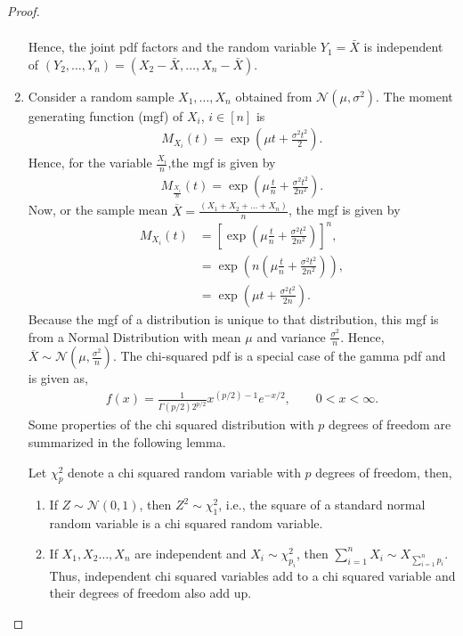 \documentclass[a4paper,english,12pt]{article}
\begin{document}
\begin{proof}
\begin{enumerate}
\begin{align}
\end{align}
Hence, the joint pdf factors and the random variable $Y_1=\bar{X}$ is independent of $ \left(Y_{2},\ldots,Y_{n}\right)=\left(X_{2}-\bar{X},\ldots,X_{n}-\bar{X}\right) $. 
\item Consider a random sample $X_1,\dots ,X_n$ obtained from $\mathcal{N}(\mu,\sigma^2)$. The moment generating function (mgf) of $X_i$, $i\in[n]$ is 
\begin{align}
M_{X_i}(t)=\exp{(\mu t +\frac{\sigma^2 t^2}{2})}.
\end{align}
Hence, for the variable $\frac{X_i}{n}$,the mgf is given by 
\begin{align}
M_{\frac{X_i}{n}}(t)=\exp{(\mu \frac{t}{n} +\frac{\sigma^2 t^2}{2n^2})}.
\end{align}
Now, or the sample mean $\overline{X}=\frac{(X_1+X_2+\dots +X_n)}{n}$, the mgf is given by 
\begin{align}
M_{X_i}(t)&={\left[\exp{(\mu \frac{t}{n} +\frac{\sigma^2 t^2}{2n^2})}\right]}^n, \nonumber \\
&=\exp{(n(\mu \frac{t}{n} +\frac{\sigma^2 t^2}{2n^2}))}, \nonumber \\
&=\exp{(\mu t +\frac{\sigma^2 t^2}{2n})}.
\end{align}
Because the mgf of a distribution is unique to that distribution, this mgf is from a Normal Distribution with mean $\mu$ and variance $\frac{\sigma^2}{n}$. Hence, $\overline{X} \sim \mathcal{N}(\mu,\frac{\sigma^2}{n}).$
The chi-squared pdf is a special case of the gamma pdf and is given as, 
\begin{align}
f(x)=\frac{1}{\Gamma(p/2)2^{p/2}}x^{(p/2)-1}e^{-x/2}, \qquad 0<x<\infty. 
\end{align}
Some properties of the chi squared distribution with $p$ degrees of freedom are summarized in the following lemma. 
\begin{lem} \label{lemma_5.3.2_casella_berger}
Let $\chi _p^2$ denote a chi squared random variable with $p$ degrees of freedom, then, 
\renewcommand{\labelenumi}{\alph{enumi})}
\begin{enumerate}
\item If $Z\sim \mathcal{N}(0,1)$, then $Z^2 \sim \chi_1^2$, i.e., the  square of a standard normal random variable is a chi squared random variable. 
\item If $X_1,X_2\dots , X_n$ are independent and $X_i\sim \chi _{p_i}^2$, then $\sum_{i=1}^nX_i\sim X_{\sum_{i=1}^np_i}$. Thus, independent chi squared variables add to a chi squared variable and their degrees of freedom also add up. 

\end{enumerate}
\end{lem}
\end{enumerate}
\end{proof}
\end{document}

